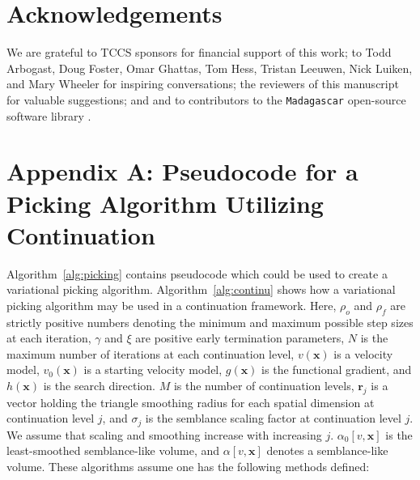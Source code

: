 \section{Acknowledgements}
We are grateful to TCCS sponsors for financial support of this work; to Todd Arbogast, Doug Foster, Omar Ghattas, Tom Hess, Tristan Leeuwen, Nick Luiken, and Mary Wheeler for inspiring conversations; the reviewers of this manuscript for valuable suggestions; and and to contributors to the \texttt{Madagascar} open-source software library \cite[]{madagascar}.

\appendix
\section{Appendix A: Pseudocode for a Picking Algorithm Utilizing Continuation}
Algorithm~\ref{alg:picking} contains pseudocode which could be used to create a variational picking algorithm.  Algorithm~\ref{alg:continu} shows how a variational picking algorithm may be used in a continuation framework.  Here, $\rho_o$ and $\rho_f$ are strictly positive numbers denoting the minimum and maximum possible step sizes at each iteration, $\gamma$ and $\xi$ are positive early termination parameters, $N$ is the maximum number of iterations at each continuation level, $v(\mathbf{x})$ is a velocity model, $v_0(\mathbf{x})$ is a starting velocity model, $g(\mathbf{x})$ is the functional gradient, and $h(\mathbf{x})$ is the search direction. $M$ is the number of continuation levels,  $\mathbf{r}_j$ is a vector holding the triangle smoothing radius for each spatial dimension at continuation level $j$, and $\sigma_j$ is the semblance scaling factor at continuation level $j$. We assume that scaling and smoothing increase with increasing $j$. $\alpha_0 \left[v,\mathbf{x}\right]$ is the least-smoothed semblance-like volume, and $\alpha \left[v,\mathbf{x}\right]$ denotes a semblance-like volume.  These algorithms assume one has the following methods defined:
